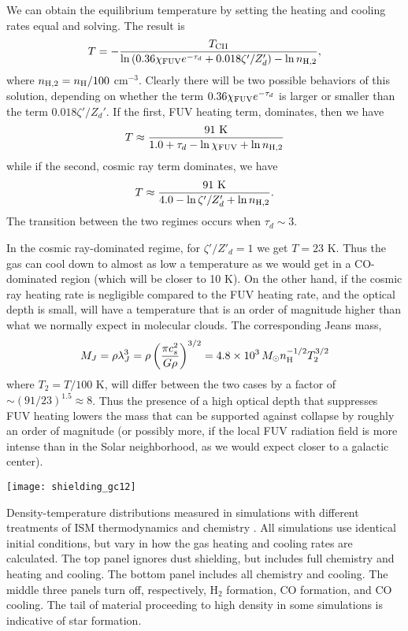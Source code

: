 We can obtain the equilibrium temperature by setting the heating and cooling rates equal and solving. The result is
\begin{equation}
T = -\frac{T_{\rm CII}}{\ln \left( 0.36 \chi_{\rm FUV} e^{-\tau_d} + 0.018 \zeta'/Z'_d\right) - \ln n_{\rm H,2}},
\end{equation}
where $n_{\rm H,2} = n_{\rm H}/100$ cm$^{-3}$. Clearly there will be two possible behaviors of this solution, depending on whether the term $0.36 \chi_{\rm FUV} e^{-\tau_d}$ is larger or smaller than the term $0.018\zeta'/Z_d'$. If the first, FUV heating term, dominates, then we have
\begin{equation}
T \approx \frac{91\mbox{ K}}{1.0 + \tau_d - \ln \chi_{\rm FUV} + \ln n_{\rm H,2}}
\end{equation}
while if the second, cosmic ray term dominates, we have
\begin{equation}
T \approx \frac{91\mbox{ K}}{4.0 - \ln \zeta'/Z'_d + \ln n_{\rm H,2}}.
\end{equation}
The transition between the two regimes occurs when $\tau_d \sim 3$.

In the cosmic ray-dominated regime, for $\zeta'/Z'_d = 1$ we get $T = 23$ K. Thus the gas can cool down to almost as low a temperature as we would get in a CO-dominated region (which will be closer to 10 K). On the other hand, if the cosmic ray heating rate is negligible compared to the FUV heating rate, and the optical depth is small, will have a temperature that is an order of magnitude higher than what we normally expect in molecular clouds. The corresponding Jeans mass,
\begin{equation}
M_J = \rho \lambda_J^3 = \rho \left(\frac{\pi c_s^2}{G \rho}\right)^{3/2} = 4.8\times 10^3\,M_\odot n_{\rm H}^{-1/2} T_2^{3/2}
\end{equation}
where $T_2 = T/100$ K, will differ between the two cases by a factor of $\sim (91/23)^{1.5} \approx 8$. Thus the presence of a high optical depth that suppresses FUV heating lowers the mass that can be supported against collapse by roughly an order of magnitude (or possibly more, if the local FUV radiation field is more intense than in the Solar neighborhood, as we would expect closer to a galactic center).

\begin{marginfigure}
\texttt{[image: shielding\_gc12]}
\caption[Density-temperature distribution for different cooling models]{
\label{fig:shielding_gc12}
Density-temperature distributions measured in simulations with different treatments of ISM thermodynamics and chemistry \citep{glover12a}. All simulations use identical initial conditions, but vary in how the gas heating and cooling rates are calculated. The top panel ignores dust shielding, but includes full chemistry and heating and cooling. The bottom panel includes all chemistry and cooling. The middle three panels turn off, respectively, H$_2$ formation, CO formation, and CO cooling. The tail of material proceeding to high density in some simulations is indicative of star formation.
}
\end{marginfigure}

